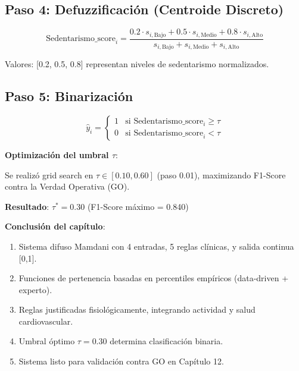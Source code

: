 \documentclass[12pt,letterpaper,twoside]{report}
\begin{document}
\subsection{Paso 4: Defuzzificación (Centroide Discreto)}

\begin{equation}
\text{Sedentarismo\_score}_i = \frac{0.2 \cdot s_{i,\text{Bajo}} + 0.5 \cdot s_{i,\text{Medio}} + 0.8 \cdot s_{i,\text{Alto}}}{s_{i,\text{Bajo}} + s_{i,\text{Medio}} + s_{i,\text{Alto}}}
\end{equation}

Valores: [0.2, 0.5, 0.8] representan niveles de sedentarismo normalizados.

\subsection{Paso 5: Binarización}

\begin{equation}
\hat{y}_i = 
\begin{cases}
1 & \text{si } \text{Sedentarismo\_score}_i \geq \tau \\
0 & \text{si } \text{Sedentarismo\_score}_i < \tau
\end{cases}
\end{equation}

\begin{decisionbox}
\textbf{Optimización del umbral $\tau$}:

Se realizó grid search en $\tau \in [0.10, 0.60]$ (paso 0.01), maximizando F1-Score contra la Verdad Operativa (GO).

\textbf{Resultado}: $\tau^* = 0.30$ (F1-Score máximo = 0.840)
\end{decisionbox}

\begin{conclusionbox}
\textbf{Conclusión del capítulo}:

\begin{enumerate}[noitemsep]
    \item Sistema difuso Mamdani con 4 entradas, 5 reglas clínicas, y salida continua [0,1].
    \item Funciones de pertenencia basadas en percentiles empíricos (data-driven + experto).
    \item Reglas justificadas fisiológicamente, integrando actividad y salud cardiovascular.
    \item Umbral óptimo $\tau=0.30$ determina clasificación binaria.
    \item Sistema listo para validación contra GO en Capítulo 12.
\end{enumerate}
\end{conclusionbox}
\end{document}

